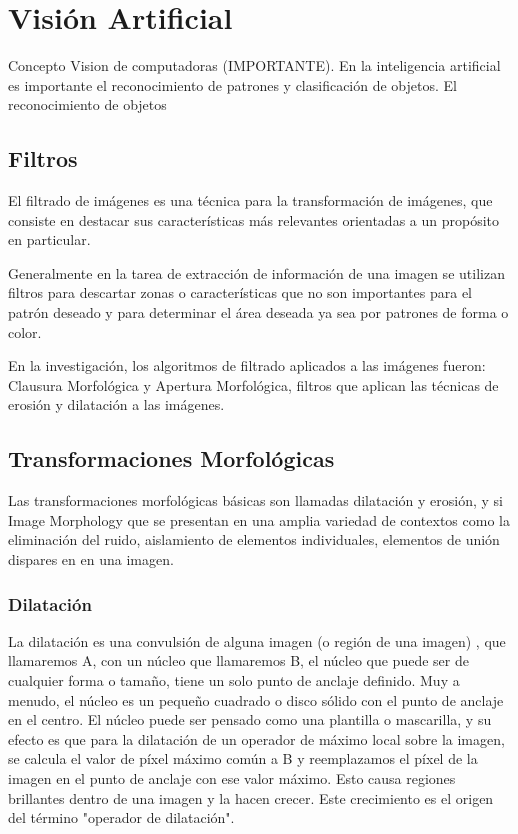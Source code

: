 \section{Visión Artificial} \label{sect:PCG}

Concepto Vision de computadoras (IMPORTANTE). En la inteligencia artificial es importante el reconocimiento de patrones y clasificación de objetos. El reconocimiento de objetos 
\subsection{Filtros }
El filtrado de imágenes es una técnica para la transformación de imágenes, que consiste en destacar  sus características más relevantes orientadas a un propósito en particular. 

Generalmente en la tarea de extracción de información de una imagen se utilizan filtros para descartar zonas o características que no son importantes para el patrón deseado y para determinar el área deseada ya sea por patrones de forma o color.

En la investigación, los algoritmos de filtrado aplicados a las imágenes fueron: Clausura Morfológica y Apertura Morfológica, filtros que aplican las técnicas de erosión y dilatación a las imágenes.

\subsection{Transformaciones Morfológicas}
Las transformaciones morfológicas básicas son llamadas dilatación y erosión, y si Image Morphology que se presentan en una amplia variedad de contextos como la eliminación del ruido, aislamiento de elementos individuales, elementos de unión dispares en en una imagen.

\subsubsection{Dilatación}
La dilatación es una convulsión de alguna imagen (o región de una imagen) , que llamaremos A, con un núcleo que llamaremos B, el núcleo que puede ser de cualquier forma o tamaño, tiene un solo punto de anclaje definido. Muy  a menudo, el núcleo es un pequeño cuadrado o disco sólido con el punto de anclaje en el centro. El núcleo puede ser pensado como una plantilla  o mascarilla, y su efecto es que para la dilatación de un operador de máximo local sobre la imagen, se calcula el valor de píxel máximo común a B y reemplazamos el píxel de la imagen en el punto de anclaje con ese valor máximo. Esto causa regiones brillantes dentro de una imagen y la hacen crecer. Este crecimiento es el origen del término "operador de dilatación". 

